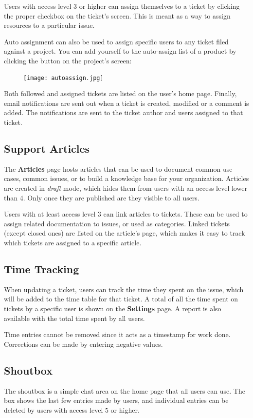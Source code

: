 \documentclass[11pt]{article}
\begin{document}
Users with access level 3 or higher can assign themselves to a ticket by clicking the proper checkbox on the ticket's screen. This is meant as a way to assign resources to a particular issue.

Auto assignment can also be used to assign specific users to any ticket filed against a project. You can add yourself to the auto-assign list of a product by clicking the button on the project's screen:

\begin{figure}[h]
\texttt{[image: autoassign.jpg]}
\end{figure}

Both followed and assigned tickets are listed on the user's home page. Finally, email notifications are sent out when a ticket is created, modified or a comment is added. The notifications are sent to the ticket author and users assigned to that ticket.

\subsection{Support Articles}
The \textbf{Articles} page hosts articles that can be used to document common use cases, common issues, or to build a knowledge base for your organization. Articles are created in \textit{draft} mode, which hides them from users with an access level lower than 4. Only once they are published are they visible to all users.

Users with at least access level 3 can link articles to tickets. These can be used to assign related documentation to issues, or used as categories. Linked tickets (except closed ones) are listed on the article's page, which makes it easy to track which tickets are assigned to a specific article.

\subsection{Time Tracking}
When updating a ticket, users can track the time they spent on the issue, which will be added to the time table for that ticket. A total of all the time spent on tickets by a specific user is shown on the \textbf{Settings} page. A report is also available with the total time spent by all users.

Time entries cannot be removed since it acts as a timestamp for work done. Corrections can be made by entering negative values.

\subsection{Shoutbox}
The shoutbox is a simple chat area on the home page that all users can use. The box shows the last few entries made by users, and individual entries can be deleted by users with access level 5 or higher.
\end{document}
